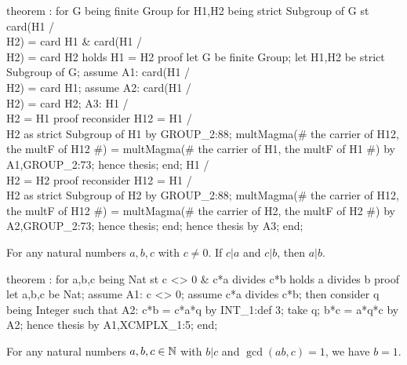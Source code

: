 \nwenddocs{}\endmoddef\nwstartdeflinemarkup{}\nwenddeflinemarkup
theorem :
  for G being finite Group
  for H1,H2 being strict Subgroup of G
  st card(H1 /\\ H2) = card H1 & card(H1 /\\ H2) = card H2
  holds H1 = H2
proof
  let G be finite Group;
  let H1,H2 be strict Subgroup of G;
  assume A1: card(H1 /\\ H2) = card H1;
  assume A2: card(H1 /\\ H2) = card H2;
  A3: H1 /\\ H2 = H1
  proof
    reconsider H12 = H1 /\\ H2 as strict Subgroup of H1 by GROUP_2:88;
    multMagma(# the carrier of H12, the multF of H12 #)
    = multMagma(# the carrier of H1, the multF of H1 #) by A1,GROUP_2:73;
    hence thesis;
  end;
  H1 /\\ H2 = H2
  proof
    reconsider H12 = H1 /\\ H2 as strict Subgroup of H2 by GROUP_2:88;
    multMagma(# the carrier of H12, the multF of H12 #)
    = multMagma(# the carrier of H2, the multF of H2 #) by A2,GROUP_2:73;
    hence thesis;
  end;
  hence thesis by A3;
end;
\eatline
{}\nwendcode{}\nwdocspar
\begin{theorem}
For any natural numbers $a,b,c$ with $c\neq0$. If $c|a$ and $c|b$, then $a|b$.
\end{theorem}

\nwenddocs{}\endmoddef\nwstartdeflinemarkup{}\nwenddeflinemarkup
theorem :
  for a,b,c being Nat
  st c <> 0 & c*a divides c*b
  holds a divides b
proof
  let a,b,c be Nat;
  assume A1: c <> 0;
  assume c*a divides c*b;
  then consider q being Integer such that
  A2: c*b = c*a*q by INT_1:def 3;
  take q;
  b*c = a*q*c by A2;
  hence thesis by A1,XCMPLX_1:5;
end;
\eatline
{}\nwendcode{}\nwdocspar
\begin{theorem}
For any natural numbers $a,b,c\in\mathbb{N}$ with $b|c$ and $\gcd(ab,c)=1$, we
have $b=1$.
\end{theorem}

